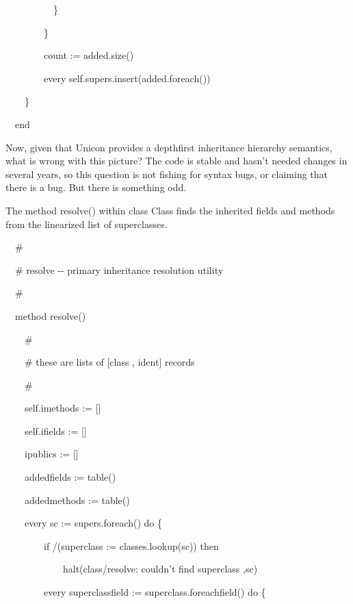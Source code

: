 {\ttfamily\mdseries
\ \ \ \ \ \ \ \ \ \ \}}

{\ttfamily\mdseries
\ \ \ \ \ \ \ \ \}}

{\ttfamily\mdseries
\ \ \ \ \ \ \ \ count := added.size()}

{\ttfamily\mdseries
\ \ \ \ \ \ \ \ every self.supers.insert(added.foreach())}

{\ttfamily\mdseries
\ \ \ \ \}}

{\ttfamily\mdseries
\ \ end}


Now, given that Unicon provides a depthfirst inheritance hierarchy
semantics, what is wrong with this picture? The code is stable and
hasn't needed changes in several years, so this question is not
fishing for syntax bugs, or claiming that there is a bug. But there is
something odd.

The method resolve() within class Class finds the inherited fields and
methods from the linearized list of superclasses.


{\ttfamily\mdseries
\ \ \#}

{\ttfamily\mdseries
\ \ \# resolve -{}- primary inheritance resolution utility}

{\ttfamily\mdseries
\ \ \#}

{\ttfamily\mdseries
\ \ method resolve()}

{\ttfamily\mdseries
\ \ \ \ \#}

{\ttfamily\mdseries
\ \ \ \ \# these are lists of [class , ident] records}

{\ttfamily\mdseries
\ \ \ \ \#}

{\ttfamily\mdseries
\ \ \ \ self.imethods := []}

{\ttfamily\mdseries
\ \ \ \ self.ifields := []}

{\ttfamily\mdseries
\ \ \ \ ipublics := []}

{\ttfamily\mdseries
\ \ \ \ addedfields := table()}

{\ttfamily\mdseries
\ \ \ \ addedmethods := table()}

{\ttfamily\mdseries
\ \ \ \ every sc := supers.foreach() do \{}

{\ttfamily\mdseries
\ \ \ \ \ \ \ \ if /(superclass := classes.lookup(sc)) then}

{\ttfamily\mdseries
\ \ \ \ \ \ \ \ \ \ \ \ halt({\textquotedbl}class/resolve: couldn't find superclass {\textquotedbl},sc)}

{\ttfamily\mdseries
\ \ \ \ \ \ \ \ every superclassfield := superclass.foreachfield() do \{}


